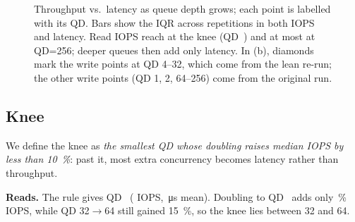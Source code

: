 \begin{figure}[!htbp]
  \centering
  \caption{Throughput vs.\ latency as queue depth grows; each point is labelled with its QD. Bars show
  the IQR across repetitions in both IOPS and latency. Read IOPS reach
   at the knee (QD~)
  and at most  at QD=256; deeper queues then add only latency.
  In (b), diamonds mark the write points at QD 4--32, which come from the lean re-run; the other write
  points (QD 1, 2, 64--256) come from the original run. }\label{fig:queue-depth}
\end{figure}

\subsection{Knee}
We define the knee as \emph{the smallest QD whose doubling raises median IOPS by less than
\qty{10}{\percent}}: past it, most extra concurrency becomes latency rather than throughput.

\textbf{Reads.} The rule gives QD~
( IOPS,
\,\si{\micro\second} mean). Doubling to
QD~ adds only
\,\% IOPS, while QD 32$\to$64 still gained
\qty{15}{\percent}, so the knee lies between 32 and 64.

